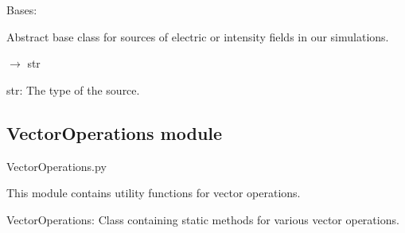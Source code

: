 \documentclass[letterpaper,10pt,english]{sphinxmanual}
\begin{document}

\begin{fulllineitems}
\label{\detokenize{source/Sources:Sources.Source}}
\pysigstartsignatures
\pysigline
{}
\pysigstopsignatures
\sphinxAtStartPar
Bases: 

\sphinxAtStartPar
Abstract base class for sources of electric or intensity fields
in our simulations.


\begin{fulllineitems}
\label{\detokenize{source/Sources:Sources.Source.get_source_type}}
\pysigstartsignatures
\pysiglinewithargsret
{}
{}
{{ $\rightarrow$ str}}
\pysigstopsignatures\begin{description}
\sphinxAtStartPar
str: The type of the source.

\end{description}

\end{fulllineitems}


\end{fulllineitems}


\sphinxstepscope


\subsection{VectorOperations module}
\label{\detokenize{source/VectorOperations:module-VectorOperations}}\label{\detokenize{source/VectorOperations:vectoroperations-module}}\label{\detokenize{source/VectorOperations::doc}}
\sphinxAtStartPar
VectorOperations.py

\sphinxAtStartPar
This module contains utility functions for vector operations.
\begin{description}
\sphinxAtStartPar
VectorOperations: Class containing static methods for various vector operations.

\end{description}
\end{document}
